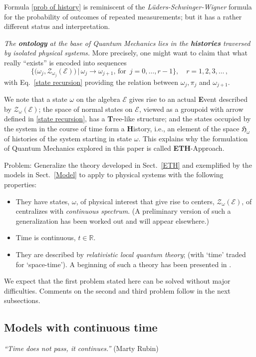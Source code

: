 \documentclass[12pt]{article}
\begin{document}
{Formula \eqref{prob of history} is reminiscent of the \textit{L\"uders-Schwinger-Wigner} formula \cite{LSW} for the probability of outcomes of repeated measurements; but it has a rather different status and interpretation.

\textit{The {\bf{ontology}} at the base of Quantum Mechanics lies in the {\bf{histories}} traversed by isolated physical systems.} More precisely, one might want to claim that what really ``exists'' is encoded into sequences
$$\Big\{ \Big(\omega_j, \mathcal{Z}_{\omega_j}(\mathcal{E}) \Big) \,\Big| \, \omega_j \rightarrow \omega_{j+1},\,\text{for }\, j=0, \dots, r-1\Big\}, \quad r=1,2,3,\dots\,,$$
with Eq.~\eqref{state recursion} providing the relation between $\omega_j, \pi_j$ and $\omega_{j+1}$.

We note that a state $\omega$ on the algebra $\mathcal{E}$ gives rise to an actual {\bf{E}}vent described by 
$\mathcal{Z}_{\omega}(\mathcal{E})$; the space of normal states on $\mathcal{E}$, viewed as a groupoid with arrow 
defined in \eqref{state recursion}, has a {\bf{T}}ree-like structure; and the states occupied by the system in the course of 
time form a {\bf{H}}istory, i.e., an element of the space $\mathfrak{H}_{\omega}$ of histories of the system starting in 
state $\omega$. This explains why the formulation of Quantum Mechanics explored in this paper is called 
{\bf{ETH}}-Approach. 

{Problem}: Generalize the theory developed in Sect.~\ref{ETH} and exemplified by the models in Sect.~\ref{Model} to apply to physical systems with the following properties:
\begin{itemize}
\item{They have states, $\omega$, of physical interest that give rise to centers, $\mathcal{Z}_{\omega}(\mathcal{E})$, of centralizes with \textit{continuous spectrum}. (A preliminary version of such a generalization has been worked out and will appear elsewhere.)}
\item{Time is continuous, $t\in \mathbb{R}$.}
\item{They are described by \textit{relativistic local quantum theory}; (with `time' traded for `space-time'). A beginning of such a theory has been presented in \cite{Fr2}.}
\end{itemize}
We expect that the first problem stated here can be solved without major difficulties. Comments on the second and third problem follow in the next subsections.

\subsection{Models with continuous time}
\hspace{0.5cm}\textit{``Time does not pass, it continues.''} (Marty Rubin)


}
\end{document}
